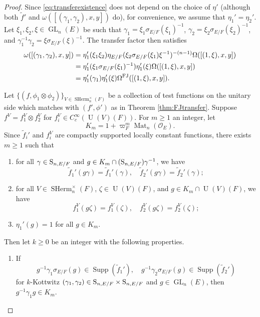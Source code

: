 \documentclass[11pt, reqno]{amsart}
\numberwithin{equation}{subsection}
\theoremstyle{plain}
\theoremstyle{definition}
\newcommand{\wt}{\widetilde}
\renewcommand{\O}{\mathcal O}
\renewcommand{\S}{\textnormal{S}}
\DeclareMathOperator{\GL}{GL}
\DeclareMathOperator{\Mat}{Mat}
\DeclareMathOperator{\SHerm}{SHerm}
\DeclareMathOperator{\Supp}{Supp}
\DeclareMathOperator{\U}{U}
\newcommand{\FJ}{\textnormal{FJ}}
\begin{document}
\begin{proof}
Since \eqref{eq:transferexistence} does not
depend on the choice of $\eta'$ (although
both $\wt f'$ and 
$\omega([(\gamma_1, \gamma_2), x, y])$ do), 
for convenience, we assume that $\eta_1' = \eta_2'$.
Let $\xi_1, \xi_2, \xi \in \GL_n(E)$ be such
that $\gamma_1 = \xi_1\sigma_{E/F}(\xi_1)^{-1}$,
$\gamma_2 = \xi_2\sigma_{E/F}(\xi_2)^{-1}$,
and $\gamma_1^{-1}\gamma_2 = \xi\sigma_{E/F}(\xi)^{-1}$.
The transfer factor then satisfies
\begin{align}
    \omega([(\gamma_1, \gamma_2), x, y])
    &= \eta_1'(\xi_1\xi_2)
    \eta_{E/F}(\xi_2\sigma_{E/F}(\xi_1)\xi^{-1})^{-(n-1)}\Omega([(1, \xi), x, y])\nonumber\\
    &= \eta_1'(\xi_1\sigma_{E/F}(\xi_1)^{-1})
    \eta_1'(\xi)
    \Omega([(1, \xi), x, y])\nonumber\\
    &= \eta_1'(\gamma_1) \eta_1'(\xi)
    \Omega^{\FJ}([(1, \xi), x, y]). \label{eq:fjtf}
\end{align}

Let $\{(f, \phi_1 \otimes \phi_2)\}_{V \in 
\SHerm_n^\times(F)}$ be a collection of test
functions on the unitary side which matches
with $(f', \phi')$ as in Theorem
\ref{thm:FJtransfer}.
Suppose $f^V = f_1^V \otimes f_2^V$ for
$f_i^V \in C_c^\infty(\U(V)(F))$.
For $m \ge 1$ an integer, let
\[
    K_m = 1 + \varpi_F^m \Mat_n(\O_E).
\]
Since $\wt f_i'$ and $f_i^V$ are
compactly supported locally constant functions,
there exists $m \ge 1$ such that
\begin{enumerate}[(1)]
\item
for all $\gamma \in \S_{n,E/F}$ and 
$g \in K_m \cap (\S_{n,E/F})\gamma^{-1}$,
we have
\[
    \wt f_1'(g\gamma) = \wt f_1'(\gamma),\quad
    \wt f_2'(g\gamma) = \wt f_2'(\gamma);
\]   

\item
for all $V \in \SHerm_n^\times(F)$, 
$\zeta \in \U(V)(F)$, and 
$g \in K_m \cap \U(V)(F)$, we have
\[
    f_1^V(g\zeta) = f_1^V(\zeta),\quad
    f_2^V(g\zeta) = f_2^V(\zeta);
\]

\item \label{item:eta}
$\eta_1'(g) = 1$ for all $g \in K_m$.
\end{enumerate}

Then let $k \ge 0$ be an integer with the following
properties.
\begin{enumerate}[(1)]
\item
If 
\[
    g^{-1}\gamma_1 \sigma_{E/F}(g) \in 
    \Supp(\wt f_1'), \quad
    g^{-1}\gamma_2\sigma_{E/F}(g) \in \Supp(\wt f_2')
\]
for $k$-Kottwitz $(\gamma_1, \gamma_2)
\in \S_{n,E/F} \times \S_{n,E/F}$
and $g \in \GL_n(E)$, then 
$g^{-1}\gamma_1 g \in K_m$.


\end{enumerate}
\end{proof}
\end{document}
